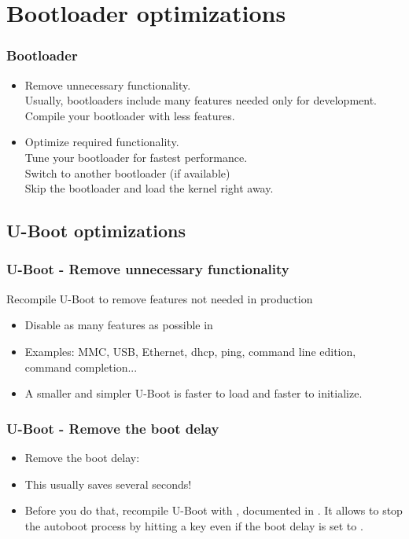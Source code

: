 \section{Bootloader optimizations}

\begin{frame}
\frametitle{Bootloader}
\begin{itemize}

\item Remove unnecessary functionality.\\
      Usually, bootloaders include many features needed only for
      development. Compile your bootloader with less features.
\item Optimize required functionality.\\
      Tune your bootloader for fastest performance. \\
      Switch to another bootloader (if available) \\
      Skip the bootloader and load the kernel right away.
\end{itemize}
\end{frame}

\subsection{U-Boot optimizations}

\begin{frame}
\frametitle{U-Boot - Remove unnecessary functionality}
Recompile U-Boot to remove features not needed in production
\begin{itemize}
\item Disable as many features as possible 
      in 
\item Examples: MMC, USB, Ethernet, dhcp, ping, command line edition,
      command completion...
\item A smaller and simpler U-Boot is faster to load and faster 
      to initialize.
\end{itemize}
\end{frame}

\begin{frame}
\frametitle{U-Boot - Remove the boot delay}
\begin{itemize}
\item Remove the boot delay:\\
\item This usually saves several seconds!
\item Before you do that, recompile U-Boot with
      , documented in
      . It allows to stop the autoboot 
      process by hitting a key even if the boot delay is set to
      .
\end{itemize}
\end{frame}

